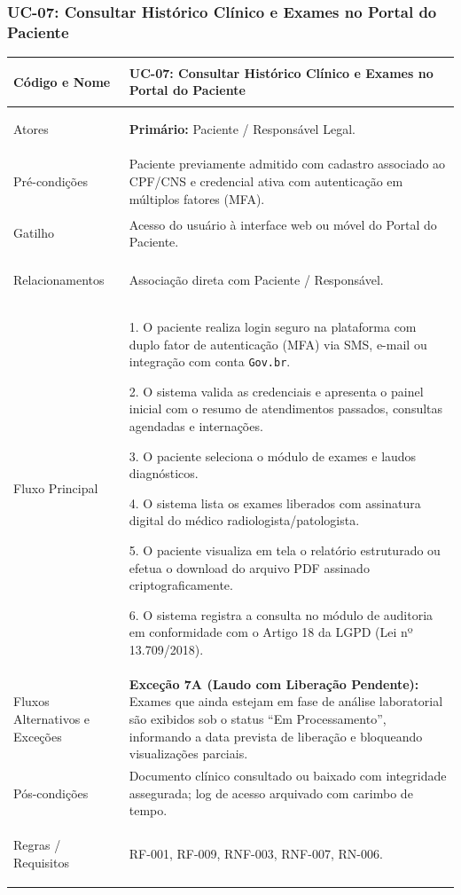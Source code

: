 \subsubsection{UC-07: Consultar Histórico Clínico e Exames no Portal do Paciente}
\label{sec:uc07}

\begingroup
\small
\begin{tabularx}{\textwidth}{>{\bfseries\raggedright\arraybackslash}p{3.4cm} X}
\toprule
Código e Nome & UC-07: Consultar Histórico Clínico e Exames no Portal do Paciente \\
\midrule
Atores & \textbf{Primário:} Paciente / Responsável Legal. \\
Pré-condições & Paciente previamente admitido com cadastro associado ao CPF/CNS e credencial ativa com autenticação em múltiplos fatores (MFA). \\
Gatilho & Acesso do usuário à interface web ou móvel do Portal do Paciente. \\
Relacionamentos & Associação direta com Paciente / Responsável. \\
\midrule
Fluxo Principal & 
1. O paciente realiza login seguro na plataforma com duplo fator de autenticação (MFA) via SMS, e-mail ou integração com conta \texttt{Gov.br}.\par
2. O sistema valida as credenciais e apresenta o painel inicial com o resumo de atendimentos passados, consultas agendadas e internações.\par
3. O paciente seleciona o módulo de exames e laudos diagnósticos.\par
4. O sistema lista os exames liberados com assinatura digital do médico radiologista/patologista.\par
5. O paciente visualiza em tela o relatório estruturado ou efetua o download do arquivo PDF assinado criptograficamente.\par
6. O sistema registra a consulta no módulo de auditoria em conformidade com o Artigo 18 da LGPD (Lei nº 13.709/2018). \\
\midrule
Fluxos Alternativos e Exceções & 
\textbf{Exceção 7A (Laudo com Liberação Pendente):} Exames que ainda estejam em fase de análise laboratorial são exibidos sob o status ``Em Processamento'', informando a data prevista de liberação e bloqueando visualizações parciais. \\
\midrule
Pós-condições & Documento clínico consultado ou baixado com integridade assegurada; log de acesso arquivado com carimbo de tempo. \\
Regras / Requisitos & RF-001, RF-009, RNF-003, RNF-007, RN-006. \\
\bottomrule
\end{tabularx}
\endgroup

